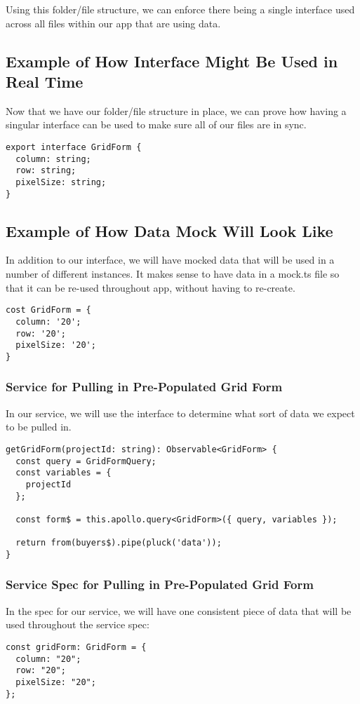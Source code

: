 Using this folder/file structure, we can enforce there being a single interface
used across all files within our app that are using data.

\subsection{ Example of How Interface Might Be Used in Real Time }
Now that we have our folder/file structure in place, we can prove how having a
singular interface can be used to make sure all of our files are in sync.

\begin{lstlisting}
export interface GridForm {
  column: string;
  row: string;
  pixelSize: string;
}
\end{lstlisting}

\subsection{ Example of How Data Mock Will Look Like }
In addition to our interface, we will have mocked data that will be used in a
number of different instances. It makes sense to have data in a mock.ts file
so that it can be re-used throughout app, without having to re-create.

\begin{lstlisting}
cost GridForm = {
  column: '20';
  row: '20';
  pixelSize: '20';
}
\end{lstlisting}

\subsubsection{ Service for Pulling in Pre-Populated Grid Form }
In our service, we will use the interface to determine what sort of data we
expect to be pulled in.

\begin{lstlisting}
getGridForm(projectId: string): Observable<GridForm> {
  const query = GridFormQuery;
  const variables = {
    projectId
  };

  const form$ = this.apollo.query<GridForm>({ query, variables });

  return from(buyers$).pipe(pluck('data'));
}
\end{lstlisting}

\subsubsection{ Service Spec for Pulling in Pre-Populated Grid Form }
In the spec for our service, we will have one consistent piece of data that will
be used throughout the service spec:
\begin{lstlisting}
const gridForm: GridForm = {
  column: "20";
  row: "20";
  pixelSize: "20";
};
\end{lstlisting}

